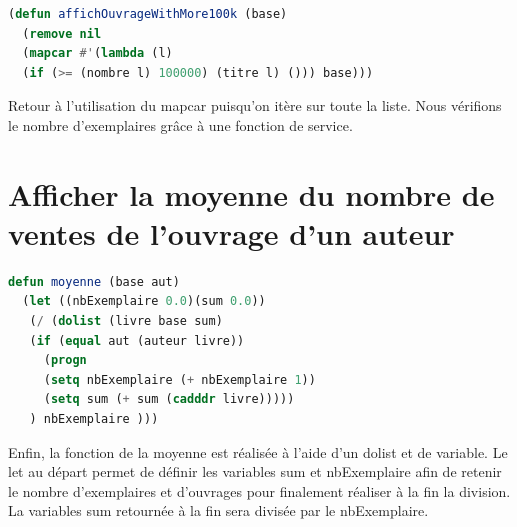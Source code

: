\documentclass[a4paper,10pt]{report}
\begin{document}
\begin{lstlisting}[language=Lisp]
(defun affichOuvrageWithMore100k (base)
  (remove nil 
  (mapcar #'(lambda (l) 
  (if (>= (nombre l) 100000) (titre l) ())) base)))
\end{lstlisting}
Retour à l’utilisation du mapcar puisqu’on itère sur toute la liste. Nous vérifions le nombre d’exemplaires grâce à une fonction de service.\newpage
\section{Afficher la moyenne du nombre de ventes de l'ouvrage d'un auteur}	  
\begin{lstlisting}[language=Lisp]
defun moyenne (base aut)
  (let ((nbExemplaire 0.0)(sum 0.0))
   (/ (dolist (livre base sum)
   (if (equal aut (auteur livre))
     (progn 
     (setq nbExemplaire (+ nbExemplaire 1))
     (setq sum (+ sum (cadddr livre)))))
   ) nbExemplaire )))
\end{lstlisting}
Enfin, la fonction de la moyenne est réalisée à l’aide d’un dolist et de variable. Le let au départ permet de définir les variables sum et nbExemplaire afin de retenir le nombre d’exemplaires et d’ouvrages pour finalement réaliser à la fin la division. La variables sum retournée à la fin sera divisée par le nbExemplaire.

	  
	  
	  
	  
	  
	  
	  
	  
	  
	  
	  
\end{document}
